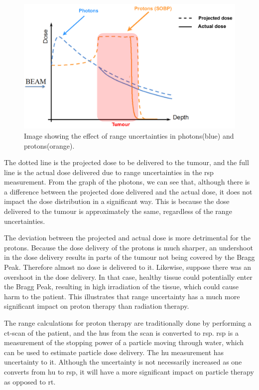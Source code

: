 \documentclass[main.tex]{subfiles}
\begin{document}
\begin{figure}[!htpb]
    \centering
    \includegraphics[width=12cm ]{images/projected_dose_graph.pdf}
    \caption{Image showing the effect of range uncertainties in photons(blue) and protons(orange)\cite{proton_challenges}.}
    \label{fig: proton_uncertainty}
\end{figure}
\FloatBarrier


 The dotted line is the projected dose to be delivered to the tumour, and the full line is the actual dose delivered due to range uncertainties in the \gls{rsp} measurement. From the graph of the photons, we can see that, although there is a difference between the projected dose delivered and the actual dose, it does not impact the dose distribution in a significant way. This is because the dose delivered to the tumour is approximately the same, regardless of the range uncertainties.
 
 The deviation between the projected and actual dose is more detrimental for the protons. Because the dose delivery of the protons is much sharper, an undershoot in the dose delivery results in parts of the tumour not being covered by the Bragg Peak. Therefore almost no dose is delivered to it. Likewise, suppose there was an overshoot in the dose delivery. In that case, healthy tissue could potentially enter the Bragg Peak, resulting in high irradiation of the tissue, which could cause harm to the patient. This illustrates that range uncertainty has a much more significant impact on proton therapy than radiation therapy.

The range calculations for proton therapy are traditionally done by performing a \gls{ct}-scan of the patient, and the \acrlong{hu}s from the scan is converted to \gls{rsp}. \gls{rsp} is a measurement of the stopping power of a particle moving through water, which can be used to estimate particle dose delivery. The \gls{hu} measurement has uncertainty to it. Although the uncertainty is not necessarily increased as one converts from \gls{hu} to \gls{rsp}, it will have a more significant impact on particle therapy as opposed to \gls{rt}\cite{proton_challenges}.
\end{document}
